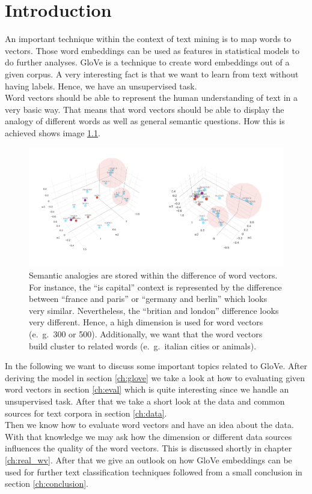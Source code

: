 \chapter{Introduction}

An important technique within the context of text mining is to map words to vectors. Those 
word embeddings can be used as features in statistical models to do further analyses. 
GloVe is a technique to create word embeddings out of a given corpus. A very interesting 
fact is that we want to learn from text without having labels. Hence, we have an unsupervised 
task. \\

Word vectors should be able to represent the human understanding of text in a very 
basic way. That means that word vectors should be able to display the analogy of different 
words as well as general semantic questions. How this is achieved shows image \ref{fig:wv}. 

\begin{figure}[!h]
\centering
\includegraphics[scale=0.7]{images/wv_glove.png} 
\caption[Word vectors in 3 dimensions trained by GloVe.]{Semantic analogies are stored within 
         the difference of word vectors. For instance, the \enquote{is capital} context is
         represented by the difference between \enquote{france and paris} or 
         \enquote{germany and berlin} which looks very similar. Nevertheless, 
         the \enquote{britian and london} difference looks very different. Hence, a high
         dimension is used for word vectors (e.~g.~300 or 500). Additionally, we want that 
         the word vectors build cluster to related words (e.~g.~italian cities or animals).}
\label{fig:wv}
\end{figure}

In the following we want to discuss some important topics related to GloVe. After 
deriving the model in section \ref{ch:glove} we take a look at how 
to evaluating given word vectors in section \ref{ch:eval} which is quite interesting 
since we handle an unsupervised task. After that we take a short look at the data 
and common sources for text corpora in section \ref{ch:data}. \\

Then we know how to evaluate word vectors and have an idea about the data. With that 
knowledge we may ask how the dimension or different data 
sources influences the quality of the word vectors. This is discussed shortly in chapter
\ref{ch:real_wv}. After that we give an outlook on how GloVe embeddings can be used for
further text classification techniques followed from a small conclusion in section
\ref{ch:conclusion}.
